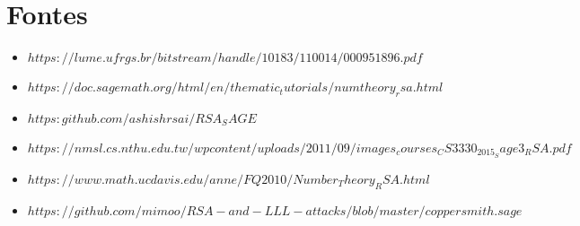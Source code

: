 \documentclass{article}
\begin{document}
						 


\ledgernotes




\section*{Fontes}
\begin{itemize}
\item $https://lume.ufrgs.br/bitstream/handle/10183/110014/000951896.pdf$
\item $https://doc.sagemath.org/html/en/thematic_tutorials/numtheory_rsa.html$
\item $https:github.com/ashishrsai/RSA_SAGE$
\item $https://nmsl.cs.nthu.edu.tw/wpcontent/uploads/2011/09/images_courses_CS3330_2015_Sage3_RSA.pdf$
\item $https://www.math.ucdavis.edu/anne/FQ2010/Number_Theory_RSA.html$
\item $https://github.com/mimoo/RSA-and-LLL-attacks/blob/master/coppersmith.sage$
\end{itemize}
\end{document}
